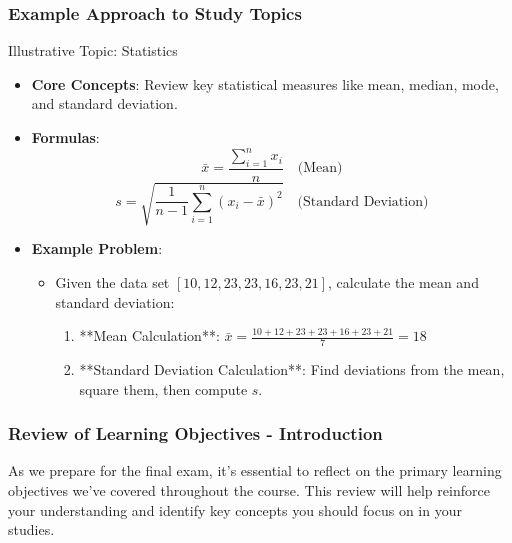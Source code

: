 \documentclass{beamer}
\begin{document}
\begin{frame}[fragile]
    \frametitle{Example Approach to Study Topics}
    \begin{block}{Illustrative Topic: Statistics}
        \begin{itemize}
            \item \textbf{Core Concepts}: Review key statistical measures like mean, median, mode, and standard deviation.
            \item \textbf{Formulas}:
                \begin{equation}
                    \bar{x} = \frac{\sum_{i=1}^{n} x_i}{n} \quad \text{(Mean)}
                \end{equation}
                \begin{equation}
                    s = \sqrt{\frac{1}{n-1}\sum_{i=1}^{n}(x_i - \bar{x})^2} \quad \text{(Standard Deviation)}
                \end{equation}
            \item \textbf{Example Problem}:
            \begin{itemize}
                \item Given the data set \([10, 12, 23, 23, 16, 23, 21]\), calculate the mean and standard deviation:
                \begin{enumerate}
                    \item **Mean Calculation**: \( \bar{x} = \frac{10 + 12 + 23 + 23 + 16 + 23 + 21}{7} = 18 \)
                    \item **Standard Deviation Calculation**: Find deviations from the mean, square them, then compute \( s \).
                \end{enumerate}
            \end{itemize}
        \end{itemize}
    \end{block}
\end{frame}

\begin{frame}[fragile]
    \frametitle{Review of Learning Objectives - Introduction}
    As we prepare for the final exam, it's essential to reflect on the primary learning objectives we've covered throughout the course. This review will help reinforce your understanding and identify key concepts you should focus on in your studies.
\end{frame}
\end{document}
